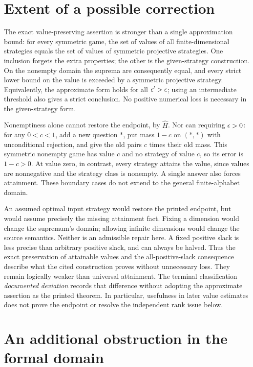 \documentclass[11pt]{article}
\begin{document}
\section{Extent of a possible correction}

The exact value-preserving assertion is stronger than a single approximation
bound: for every symmetric game, the set of values of all finite-dimensional
strategies equals the set of values of symmetric projective strategies.
One inclusion forgets the extra properties; the other is the given-strategy
construction. On the nonempty domain the suprema are consequently equal,
and every strict lower bound on the value is exceeded by a symmetric
projective strategy. Equivalently, the approximate form holds for all
$\epsilon'>\epsilon$; using an intermediate threshold also gives a strict conclusion.
No positive numerical loss is necessary in the given-strategy form.

Nonemptiness alone cannot restore the endpoint, by $\widehat H$. Nor can
requiring $\epsilon>0$: for any $0<c<1$, add a new question $*$, put mass $1-c$
on $(*,*)$ with unconditional rejection, and give the old pairs $c$ times
their old mass. This symmetric nonempty game has value $c$ and no strategy
of value $c$, so its error is $1-c>0$. At value zero, in contrast, every
strategy attains the value, since values are nonnegative and the strategy
class is nonempty. A single answer also forces attainment. These boundary
cases do not extend to the general finite-alphabet domain.

An assumed optimal input strategy would restore the printed endpoint, but
would assume precisely the missing attainment fact. Fixing a dimension would
change the supremum's domain; allowing infinite dimensions would change the
source semantics. Neither is an admissible repair here. A fixed positive
slack is less precise than arbitrary positive slack, and can always be halved.
Thus the exact preservation of attainable values and the all-positive-slack
consequence describe what the cited construction proves without unnecessary
loss. They remain logically weaker than universal attainment. The terminal
classification \emph{documented deviation} records that difference without
adopting the approximate assertion as the printed theorem. In particular,
usefulness in later value estimates does not prove the endpoint or resolve
the independent rank issue below.

\section{An additional obstruction in the formal domain}
\end{document}
